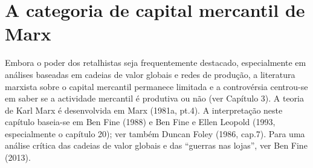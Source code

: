 \section{A categoria de capital mercantil de Marx}
 \par 
Embora o poder dos retalhistas seja frequentemente destacado, especialmente em análises baseadas em cadeias de valor globais e redes de produção, a literatura marxista sobre o capital mercantil permanece limitada e a controvérsia centrou-se em saber se a actividade mercantil é produtiva ou não (ver Capítulo {\color{blue}3}). A teoria de Karl Marx é desenvolvida em Marx (1981a, pt.{\color{blue}4}). A interpretação neste capítulo baseia-se em Ben Fine (1988) e Ben Fine e Ellen Leopold (1993, especialmente o capítulo {\color{blue}20}); ver também Duncan Foley (1986, cap.{\color{blue}7}). Para uma análise crítica das cadeias de valor globais e das “guerras nas lojas”, ver Ben Fine (2013).